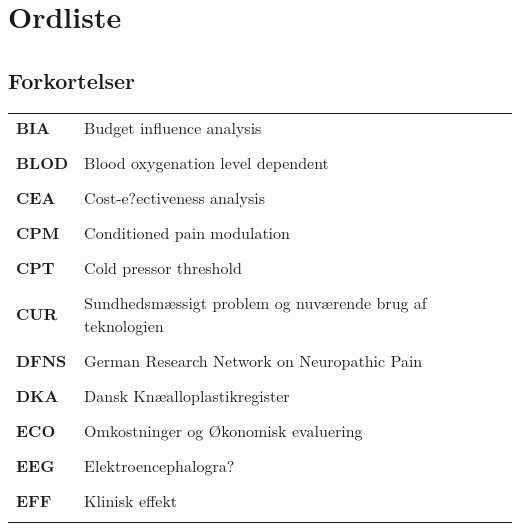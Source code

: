 \chapter*{Ordliste} \label{ordliste}
\vspace{-.75cm}
\section*{Forkortelser}
\vspace{0.75cm}
\begin{longtable}{p{}  p{}}

\textbf{BIA} & Budget influence analysis                                
\\ \\
\textbf{BLOD}& Blood oxygenation level dependent                        
\\ \\
\textbf{CEA} & Cost-e?ectiveness analysis                               
\\ \\
\textbf{CPM} & Conditioned pain modulation                              
\\ \\
\textbf{CPT} & Cold pressor threshold                                   
\\ \\
\textbf{CUR} & Sundhedsmæssigt problem og nuværende brug af teknologien 
\\ \\
\textbf{DFNS}& German Research Network on Neuropathic Pain              
\\ \\
\textbf{DKA} & Dansk Knæalloplastikregister                             
\\ \\
\textbf{ECO} & Omkostninger og Økonomisk evaluering                     
\\ \\
\textbf{EEG} & Elektroencephalogra?                                     
\\ \\
\textbf{EFF} & Klinisk effekt                                           
\\ \\

\end{longtable}
